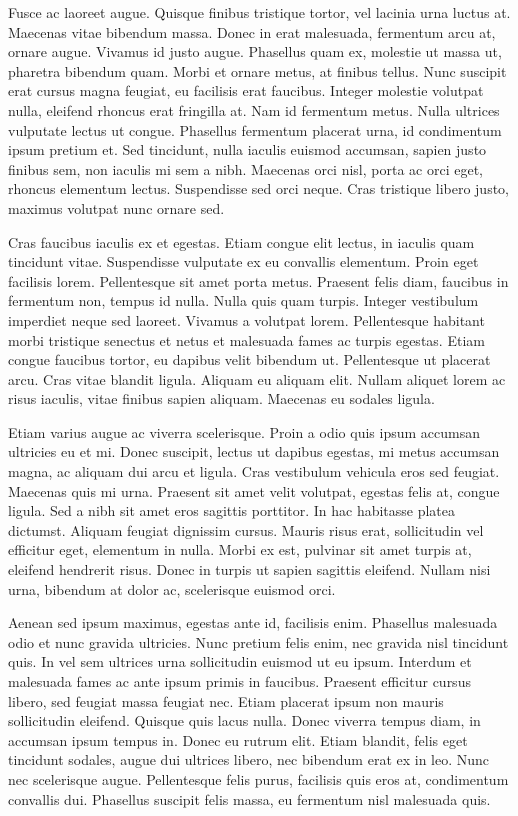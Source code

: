 \documentclass[10pt]{article}
\begin{document}
	Fusce ac laoreet augue. Quisque finibus tristique tortor, vel lacinia urna luctus at. Maecenas vitae bibendum massa. Donec in erat malesuada, fermentum arcu at, ornare augue. Vivamus id justo augue. Phasellus quam ex, molestie ut massa ut, pharetra bibendum quam. Morbi et ornare metus, at finibus tellus. Nunc suscipit erat cursus magna feugiat, eu facilisis erat faucibus. Integer molestie volutpat nulla, eleifend rhoncus erat fringilla at. Nam id fermentum metus. Nulla ultrices vulputate lectus ut congue. Phasellus fermentum placerat urna, id condimentum ipsum pretium et. Sed tincidunt, nulla iaculis euismod accumsan, sapien justo finibus sem, non iaculis mi sem a nibh. Maecenas orci nisl, porta ac orci eget, rhoncus elementum lectus. Suspendisse sed orci neque. Cras tristique libero justo, maximus volutpat nunc ornare sed.
	
	Cras faucibus iaculis ex et egestas. Etiam congue elit lectus, in iaculis quam tincidunt vitae. Suspendisse vulputate ex eu convallis elementum. Proin eget facilisis lorem. Pellentesque sit amet porta metus. Praesent felis diam, faucibus in fermentum non, tempus id nulla. Nulla quis quam turpis. Integer vestibulum imperdiet neque sed laoreet. Vivamus a volutpat lorem. Pellentesque habitant morbi tristique senectus et netus et malesuada fames ac turpis egestas. Etiam congue faucibus tortor, eu dapibus velit bibendum ut. Pellentesque ut placerat arcu. Cras vitae blandit ligula. Aliquam eu aliquam elit. Nullam aliquet lorem ac risus iaculis, vitae finibus sapien aliquam. Maecenas eu sodales ligula.
	
	Etiam varius augue ac viverra scelerisque. Proin a odio quis ipsum accumsan ultricies eu et mi. Donec suscipit, lectus ut dapibus egestas, mi metus accumsan magna, ac aliquam dui arcu et ligula. Cras vestibulum vehicula eros sed feugiat. Maecenas quis mi urna. Praesent sit amet velit volutpat, egestas felis at, congue ligula. Sed a nibh sit amet eros sagittis porttitor. In hac habitasse platea dictumst. Aliquam feugiat dignissim cursus. Mauris risus erat, sollicitudin vel efficitur eget, elementum in nulla. Morbi ex est, pulvinar sit amet turpis at, eleifend hendrerit risus. Donec in turpis ut sapien sagittis eleifend. Nullam nisi urna, bibendum at dolor ac, scelerisque euismod orci.
	
	Aenean sed ipsum maximus, egestas ante id, facilisis enim. Phasellus malesuada odio et nunc gravida ultricies. Nunc pretium felis enim, nec gravida nisl tincidunt quis. In vel sem ultrices urna sollicitudin euismod ut eu ipsum. Interdum et malesuada fames ac ante ipsum primis in faucibus. Praesent efficitur cursus libero, sed feugiat massa feugiat nec. Etiam placerat ipsum non mauris sollicitudin eleifend. Quisque quis lacus nulla. Donec viverra tempus diam, in accumsan ipsum tempus in. Donec eu rutrum elit. Etiam blandit, felis eget tincidunt sodales, augue dui ultrices libero, nec bibendum erat ex in leo. Nunc nec scelerisque augue. Pellentesque felis purus, facilisis quis eros at, condimentum convallis dui. Phasellus suscipit felis massa, eu fermentum nisl malesuada quis.
	
\end{document}
